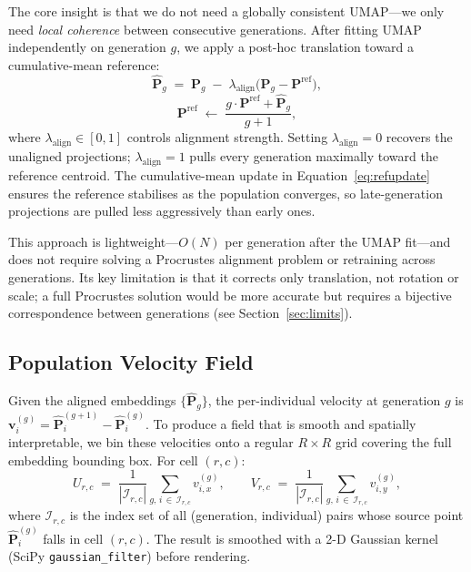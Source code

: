 \documentclass{article}
\begin{document}
The core insight is that we do not need a globally consistent UMAP---we only
need \emph{local coherence} between consecutive generations.
After fitting UMAP independently on generation $g$, we apply a post-hoc
translation toward a cumulative-mean reference:
\begin{equation}
  \hat{\mathbf{P}}_g \;=\; \mathbf{P}_g \;-\; \lambda_{\text{align}}
    \bigl(\mathbf{P}_g - \mathbf{P}^{\text{ref}}\bigr),
  \label{eq:align}
\end{equation}
\begin{equation}
  \mathbf{P}^{\text{ref}} \;\leftarrow\;
    \frac{g \cdot \mathbf{P}^{\text{ref}} + \hat{\mathbf{P}}_g}{g+1},
  \label{eq:refupdate}
\end{equation}
where $\lambda_{\text{align}} \in [0,1]$ controls alignment strength.
Setting $\lambda_{\text{align}} = 0$ recovers the unaligned projections;
$\lambda_{\text{align}} = 1$ pulls every generation maximally toward the
reference centroid.
The cumulative-mean update in Equation~\eqref{eq:refupdate} ensures the
reference stabilises as the population converges, so late-generation
projections are pulled less aggressively than early ones.

This approach is lightweight---$O(N)$ per generation after the UMAP
fit---and does not require solving a Procrustes alignment problem or retraining
across generations.
Its key limitation is that it corrects only translation, not rotation or scale;
a full Procrustes solution would be more accurate but requires a bijective
correspondence between generations (see Section~\ref{sec:limits}).

\subsection{Population Velocity Field}
\label{sec:velfield}

Given the aligned embeddings $\{\hat{\mathbf{P}}_g\}$, the per-individual
velocity at generation $g$ is
$\mathbf{v}^{(g)}_i = \hat{\mathbf{P}}^{(g+1)}_i - \hat{\mathbf{P}}^{(g)}_i$.
To produce a field that is smooth and spatially interpretable, we bin these
velocities onto a regular $R \times R$ grid covering the full embedding bounding
box.
For cell $(r,c)$:
\begin{equation}
  U_{r,c} \;=\; \frac{1}{|\mathcal{I}_{r,c}|}
    \sum_{g,\,i \,\in\, \mathcal{I}_{r,c}} v^{(g)}_{i,x},
  \qquad
  V_{r,c} \;=\; \frac{1}{|\mathcal{I}_{r,c}|}
    \sum_{g,\,i \,\in\, \mathcal{I}_{r,c}} v^{(g)}_{i,y},
  \label{eq:velgrid}
\end{equation}
where $\mathcal{I}_{r,c}$ is the index set of all (generation, individual)
pairs whose source point $\hat{\mathbf{P}}^{(g)}_i$ falls in cell $(r,c)$.
The result is smoothed with a 2-D Gaussian kernel
(SciPy \texttt{gaussian\_filter}) before rendering.
\end{document}
